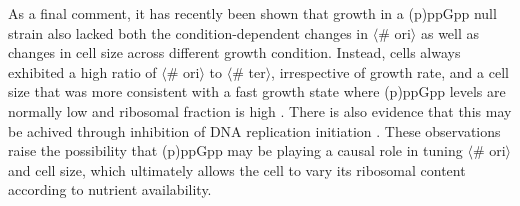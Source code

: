 As a final comment, it has recently been shown that growth in a (p)ppGpp null
strain also lacked both the condition-dependent changes in $\langle$\#
ori$\rangle$ as well as changes in cell size across different growth condition.
Instead, cells always exhibited a high ratio of $\langle$\# ori$\rangle$ to
$\langle$\# ter$\rangle$, irrespective of growth rate, and a cell size that was
more consistent with a fast growth state where (p)ppGpp levels are normally low
\citep{fernandezcoll2020} and ribosomal fraction is high \citep{zhu2019}. There
is also evidence that this may be achived through inhibition of DNA replication
initiation \citep{kraemer2019}. These observations raise the possibility that
(p)ppGpp may be playing a causal role in tuning $\langle$\# ori$\rangle$ and
cell size, which ultimately allows the cell to vary its ribosomal content
according to nutrient availability.
